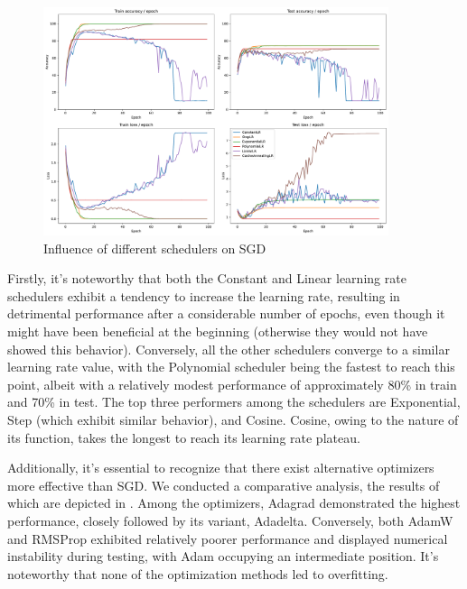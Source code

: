 \begin{figure}[H]
    \centering
    \includegraphics*[width=0.9\textwidth]{figs/CNN/schedulers_influence.pdf}
    \caption{Influence of different schedulers on SGD}
    \label{fig:schedulers_influence}
\end{figure}

Firstly, it's noteworthy that both the Constant and Linear learning rate schedulers exhibit a tendency to increase the learning rate, resulting in detrimental performance after a considerable number of epochs, even though it might have been beneficial at the beginning (otherwise they would not have showed this behavior). Conversely, all the other schedulers converge to a similar learning rate value, with the Polynomial scheduler being the fastest to reach this point, albeit with a relatively modest performance of approximately 80\% in train and 70\% in test. The top three performers among the schedulers are Exponential, Step (which exhibit similar behavior), and Cosine. Cosine, owing to the nature of its function, takes the longest to reach its learning rate plateau.

Additionally, it's essential to recognize that there exist alternative optimizers more effective than SGD. We conducted a comparative analysis, the results of which are depicted in . Among the optimizers, Adagrad demonstrated the highest performance, closely followed by its variant, Adadelta. Conversely, both AdamW and RMSProp exhibited relatively poorer performance and displayed numerical instability during testing, with Adam occupying an intermediate position. It's noteworthy that none of the optimization methods led to overfitting.

